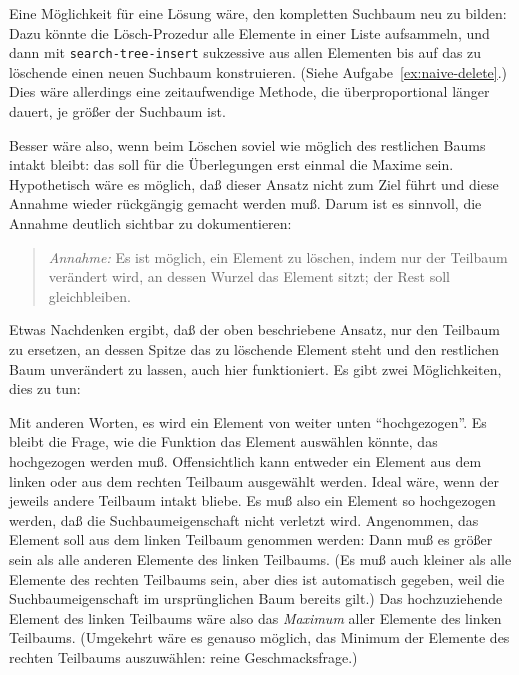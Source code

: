 Eine Möglichkeit für eine Lösung wäre, den kompletten Suchbaum neu zu
bilden: Dazu könnte die Lösch-Prozedur alle Elemente in einer Liste
aufsammeln, und dann mit \texttt{search-tree-insert} sukzessive aus
allen Elementen bis auf das zu löschende einen neuen Suchbaum
konstruieren.  (Siehe Aufgabe~\ref{ex:naive-delete}.)  Dies wäre
allerdings eine zeitaufwendige Methode, die überproportional länger
dauert, je größer der Suchbaum ist.

Besser wäre also, wenn beim Löschen soviel wie möglich des restlichen
Baums intakt bleibt: das soll für die Überlegungen erst einmal die
Maxime sein.  Hypothetisch wäre es möglich, daß dieser Ansatz nicht
zum Ziel führt und diese Annahme wieder rückgängig gemacht werden
muß.  Darum ist es sinnvoll, die Annahme deutlich sichtbar
zu dokumentieren:

\begin{quote}
  \textit{Annahme:} Es ist möglich, ein Element zu löschen, indem nur
  der Teilbaum verändert wird, an dessen Wurzel das Element sitzt; der
  Rest soll gleichbleiben.
\end{quote}

Etwas Nachdenken ergibt, daß der oben beschriebene
Ansatz, nur den Teilbaum zu ersetzen, an dessen Spitze das zu
löschende Element steht und den restlichen Baum unverändert zu lassen,
auch hier funktioniert.  Es gibt zwei Möglichkeiten, dies zu tun:
%
\begin{pspdf}
\begin{center}
  {
    \Tdot
  }
  \qquad
  {
    \Tdot
  }
\end{center}
\end{pspdf}
% 
Mit anderen Worten, es wird ein Element von weiter unten
"`hochgezogen"'.  Es bleibt die Frage, wie die Funktion das Element
auswählen könnte, das hochgezogen werden muß.  Offensichtlich kann
entweder ein Element aus dem linken oder aus dem rechten Teilbaum
ausgewählt werden.  Ideal wäre, wenn der jeweils andere Teilbaum
intakt bliebe.  Es muß also ein Element so hochgezogen werden, daß die
Suchbaumeigenschaft nicht verletzt wird.  Angenommen, das Element soll
aus dem linken Teilbaum genommen werden: Dann muß es größer sein als
alle anderen Elemente des linken Teilbaums.  (Es muß auch kleiner als
alle Elemente des rechten Teilbaums sein, aber dies ist automatisch
gegeben, weil die Suchbaumeigenschaft im ursprünglichen Baum bereits
gilt.)  Das hochzuziehende Element des linken Teilbaums wäre  also das
\emph{Maximum} aller Elemente des linken Teilbaums.  (Umgekehrt wäre
es genauso möglich, das Minimum der Elemente des rechten Teilbaums
auszuwählen: reine Geschmacksfrage.)


